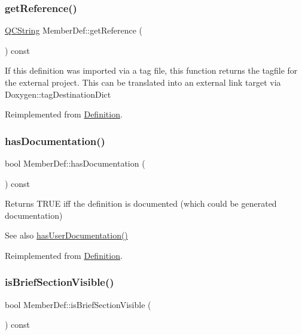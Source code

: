 \subsubsection{\texorpdfstring{getReference()}{getReference()}}
{\footnotesize\ttfamily \mbox{\hyperlink{class_q_c_string}{Q\+C\+String}} Member\+Def\+::get\+Reference (\begin{DoxyParamCaption}{ }\end{DoxyParamCaption}) const\hspace{0.3cm}{\ttfamily [virtual]}}

If this definition was imported via a tag file, this function returns the tagfile for the external project. This can be translated into an external link target via Doxygen\+::tag\+Destination\+Dict 

Reimplemented from \mbox{\hyperlink{class_definition_a0186c1c36a52590d2c7c9157aaea613f}{Definition}}.

\mbox{\label{class_member_def_aa92ecbdc1c50f61e84d2af414b551d4c}} 
\subsubsection{\texorpdfstring{hasDocumentation()}{hasDocumentation()}}
{\footnotesize\ttfamily bool Member\+Def\+::has\+Documentation (\begin{DoxyParamCaption}{ }\end{DoxyParamCaption}) const\hspace{0.3cm}{\ttfamily [virtual]}}

Returns T\+R\+UE iff the definition is documented (which could be generated documentation) \begin{DoxySeeAlso}{See also}
\mbox{\hyperlink{class_definition_ab1af13aa3951df825dea34f1bcf2a7fc}{has\+User\+Documentation()}} 
\end{DoxySeeAlso}


Reimplemented from \mbox{\hyperlink{class_definition_aa89347609a1643f6c4bc3852d9f773bb}{Definition}}.

\mbox{\label{class_member_def_ab2e646dc51f598d30d7830852e118a40}} 
\subsubsection{\texorpdfstring{isBriefSectionVisible()}{isBriefSectionVisible()}}
{\footnotesize\ttfamily bool Member\+Def\+::is\+Brief\+Section\+Visible (\begin{DoxyParamCaption}{ }\end{DoxyParamCaption}) const}


